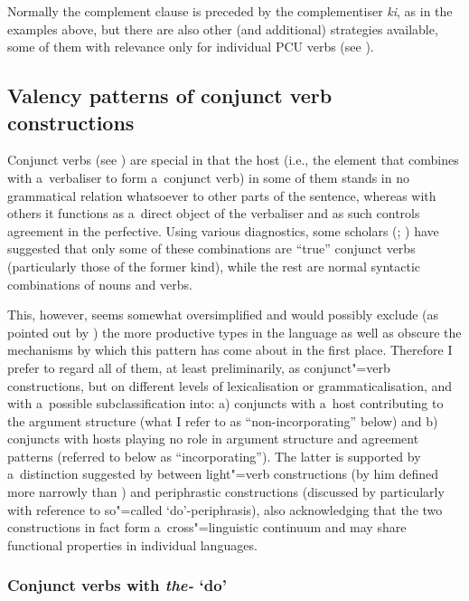 Normally the complement clause is preceded by the complementiser \textit{ki}, as in the examples above, but there are also other (and additional) strategies available, some of them with relevance only for individual PCU verbs (see ). 


\subsection{Valency patterns of conjunct verb constructions}
\label{subsec:12-2-8}

Conjunct verbs (see ) are special in that the host (i.e., the element that combines with a~verbaliser to form a~conjunct verb) in some of them stands in no grammatical relation whatsoever to other parts of the sentence, whereas with others it functions as a~direct object of the verbaliser and as such controls agreement in the perfective. Using various diagnostics, some scholars (\citealt[201]{verma1993}; \citealt[165]{mohanan1993}) have suggested that only some of these combinations are ``true'' conjunct verbs (particularly those of the former kind), while the rest are normal syntactic combinations of nouns and verbs. 



This, however, seems somewhat oversimplified and would possibly exclude (as pointed out by \citealt[160]{masica1993}) the more productive types in the language as well as obscure the mechanisms by which this pattern has come about in the first place. Therefore I prefer to regard all of them, at least preliminarily, as conjunct"=verb constructions, but on different levels of lexicalisation or grammaticalisation, and with a~possible subclassification into: a) conjuncts with a~host contributing to the argument structure (what I refer to as ``non-incorporating'' below) and b) conjuncts with hosts playing no role in argument structure and agreement patterns (referred to below as ``incorporating''). The latter is supported by a~distinction suggested by \citet[69--74]{jaeger2006} between light"=verb constructions (by him defined more narrowly than \citealt{butt2010}) and periphrastic constructions (discussed by \citeauthor{jaeger2006} particularly with reference to so"=called `do'-periphrasis), also acknowledging that the two constructions in fact form a~cross"=linguistic continuum and may share functional properties in individual languages. 



\subsubsection*{Conjunct verbs with \textit{the-} `do'}

